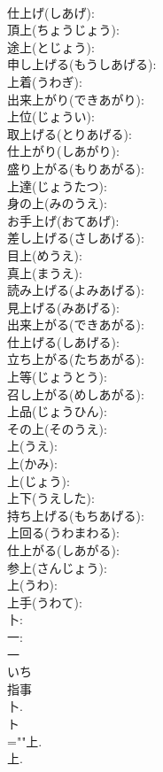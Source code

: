\documentclass[8pt]{extreport}
\begin{document}
\begin{CJK}{UTF8}{min}
\\	仕上げ(しあげ): 
\\	頂上(ちょうじょう): 
\\	途上(とじょう): 
\\	申し上げる(もうしあげる): 
\\	上着(うわぎ): 
\\	出来上がり(できあがり): 
\\	上位(じょうい): 
\\	取上げる(とりあげる): 
\\	仕上がり(しあがり): 
\\	盛り上がる(もりあがる): 
\\	上達(じょうたつ): 
\\	身の上(みのうえ): 
\\	お手上げ(おてあげ): 
\\	差し上げる(さしあげる): 
\\	目上(めうえ): 
\\	真上(まうえ): 
\\	読み上げる(よみあげる): 
\\	見上げる(みあげる): 
\\	出来上がる(できあがる): 
\\	仕上げる(しあげる): 
\\	立ち上がる(たちあがる): 
\\	上等(じょうとう): 
\\	召し上がる(めしあがる): 
\\	上品(じょうひん): 
\\	その上(そのうえ): 
\\	上(うえ): 
\\	上(かみ): 
\\	上(じょう): 
\\	上下(うえした): 
\\	持ち上げる(もちあげる): 
\\	上回る(うわまわる): 
\\	仕上がる(しあがる): 
\\	参上(さんじょう): 
\\	上(うわ): 
\\	上手(うわて): 
\\	卜: 
\\	一: 
\\	一	
\\	いち	
\\	指事 
\\	卜. 
\\	ト
\\	=""上.
\\	上.

\end{CJK}
\end{document}
